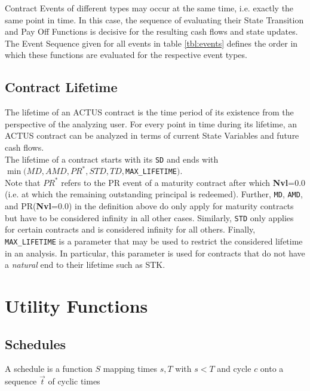 \documentclass[9pt,oneside]{amsart}
\newcommand{\attr}[1]{\texttt{#1}}
\begin{document}
\begin{multicols}{2}
Contract Events of different types may occur at the same time, i.e. exactly the same point in time. In this case, the sequence of evaluating their State Transition and Pay Off Functions is decisive for the resulting cash flows and state updates. The Event Sequence given for all events in table \ref{tbl:events} defines the order in which these functions are evaluated for the respective event types.


\subsection{Contract Lifetime}

The lifetime of an ACTUS contract is the time period of its existence from the perspective of the analyzing user. For every point in time during its lifetime, an ACTUS contract can be analyzed in terms of current State Variables and future cash flows.\\

The lifetime of a contract starts with its \attr{SD} and ends with $\min(MD, AMD, PR^*, STD, TD,$\verb'MAX_LIFETIME'$)$.\\

Note that $PR^*$ refers to the PR event of a maturity contract after which \textbf{Nvl}=0.0 (i.e. at which the remaining outstanding principal is redeemed). Further, \attr{MD}, \attr{AMD}, and PR(\textbf{Nvl}=0.0) in the definition above do only apply for maturity contracts but have to be considered infinity in all other cases. Similarly, \attr{STD} only applies for certain contracts and is considered infinity for all others. Finally, \verb'MAX_LIFETIME' is a parameter that may be used to restrict the considered lifetime in an analysis. In particular, this parameter is used for contracts that do not have a \textit{natural} end to their lifetime such as STK.



\section{Utility Functions}

\subsection{Schedules}\label{sec:schedules}

A schedule is a function $S$ mapping times $s,T$ with $s<T$ and cycle $c$ onto a sequence $\vec{t}$ of cyclic times


\end{multicols}
\end{document}
